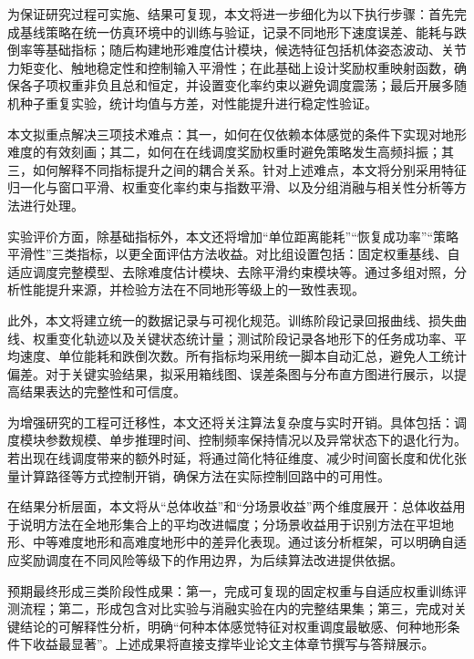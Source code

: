 \documentclass[12pt,a4paper]{ctexart}
\begin{document}
为保证研究过程可实施、结果可复现，本文将进一步细化为以下执行步骤：首先完成基线策略在统一仿真环境中的训练与验证，记录不同地形下速度误差、能耗与跌倒率等基础指标；随后构建地形难度估计模块，候选特征包括机体姿态波动、关节力矩变化、触地稳定性和控制输入平滑性；在此基础上设计奖励权重映射函数，确保各子项权重非负且总和恒定，并设置变化率约束以避免调度震荡；最后开展多随机种子重复实验，统计均值与方差，对性能提升进行稳定性验证。

本文拟重点解决三项技术难点：其一，如何在仅依赖本体感觉的条件下实现对地形难度的有效刻画；其二，如何在在线调度奖励权重时避免策略发生高频抖振；其三，如何解释不同指标提升之间的耦合关系。针对上述难点，本文将分别采用特征归一化与窗口平滑、权重变化率约束与指数平滑、以及分组消融与相关性分析等方法进行处理。

实验评价方面，除基础指标外，本文还将增加“单位距离能耗”“恢复成功率”“策略平滑性”三类指标，以更全面评估方法收益。对比组设置包括：固定权重基线、自适应调度完整模型、去除难度估计模块、去除平滑约束模块等。通过多组对照，分析性能提升来源，并检验方法在不同地形等级上的一致性表现。

此外，本文将建立统一的数据记录与可视化规范。训练阶段记录回报曲线、损失曲线、权重变化轨迹以及关键状态统计量；测试阶段记录各地形下的任务成功率、平均速度、单位能耗和跌倒次数。所有指标均采用统一脚本自动汇总，避免人工统计偏差。对于关键实验结果，拟采用箱线图、误差条图与分布直方图进行展示，以提高结果表达的完整性和可信度。

为增强研究的工程可迁移性，本文还将关注算法复杂度与实时开销。具体包括：调度模块参数规模、单步推理时间、控制频率保持情况以及异常状态下的退化行为。若出现在线调度带来的额外时延，将通过简化特征维度、减少时间窗长度和优化张量计算路径等方式控制开销，确保方法在实际控制回路中的可用性。

在结果分析层面，本文将从“总体收益”和“分场景收益”两个维度展开：总体收益用于说明方法在全地形集合上的平均改进幅度；分场景收益用于识别方法在平坦地形、中等难度地形和高难度地形中的差异化表现。通过该分析框架，可以明确自适应奖励调度在不同风险等级下的作用边界，为后续算法改进提供依据。

预期最终形成三类阶段性成果：第一，完成可复现的固定权重与自适应权重训练评测流程；第二，形成包含对比实验与消融实验在内的完整结果集；第三，完成对关键结论的可解释性分析，明确“何种本体感觉特征对权重调度最敏感、何种地形条件下收益最显著”。上述成果将直接支撑毕业论文主体章节撰写与答辩展示。
\end{document}
